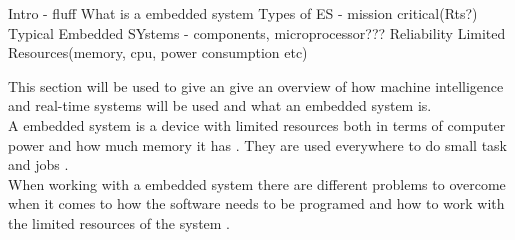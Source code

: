 Intro - fluff
What is a embedded system
Types of ES - mission critical(Rts?)
Typical Embedded SYstems - components, microprocessor???
Reliability
Limited Resources(memory, cpu, power consumption etc)


This section will be used to give an give an overview of how machine
intelligence and real-time systems will be used and what an embedded system
is.\\

A embedded system is a device with limited resources both in terms of computer
power and how much memory it has \PS. They are used everywhere to do small task
and jobs \PS.\\

When working with a embedded system there are different problems to overcome
when it comes to how the software needs to be programed and how to work with the
limited resources of the system \PS.\\

%
%
